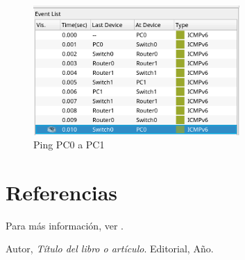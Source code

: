 \documentclass[a4paper,12pt]{article}
\begin{document}
\begin{figure}[h]
    \centering
    \includegraphics[width=0.7\textwidth]{imagenes/success.png}
    \caption{Ping PC0 a PC1}
  \end{figure}
\FloatBarrier
\section{Referencias}
Para más información, ver \cite{ref1}.

\begin{thebibliography}{9}
     Autor, \textit{Título del libro o artículo}. Editorial, Año.
\end{thebibliography}
\end{document}
